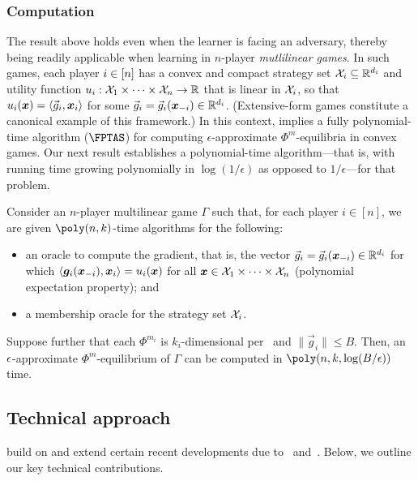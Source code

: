 \subsubsection{Computation}

The result above holds even when the learner is facing an adversary, thereby being readily applicable when learning in $n$-player \emph{mutlilinear games}. In such games, each player $i \in [n]$ has a convex and compact strategy set ${\mathcal{X}}_i \subseteq \mathbb R^{d_i}$ and utility function $u_i : {\mathcal{X}}_1 \times \dots \times {\mathcal{X}}_n \to \mathbb R$ that is linear in ${\mathcal{X}}_i$, so that $u_i({\bm{x}}) = \langle \vec{g}_i, {\bm{x}}_i \rangle$ for some $\vec{g}_i = \vec{g}_i({\bm{x}}_{-i}) \in \mathbb R^{d_i}$. (Extensive-form games constitute a canonical example of this framework.) In this context,  implies a fully polynomial-time algorithm ($\FPTAS$) for computing $\epsilon$-approximate $\Phi^m$-equilibria in convex games. Our next result establishes a polynomial-time algorithm---that is, with running time growing polynomially in $\log(1/\epsilon)$ as opposed to $1/\epsilon$---for that problem.

\begin{theorem}
    \label{theorem:main-eah}
    Consider an $n$-player multilinear game $\Gamma$ such that, for each player $i \in [n]$, we are given $\poly(n, k)$-time algorithms for the following:
\begin{itemize}
\item an oracle to compute the gradient, that is, the vector $\vec{g}_i = \vec{g}_i({\bm{x}}_{-i}) \in \mathbb R^{d_i}$ for which $\ip{\vg_i(\vx_{-i}), \vx_i} = u_i(\vx)$ for all ${\bm{x}} \in {\mathcal{X}}_1 \times \dots \times {\mathcal{X}}_n$ (polynomial expectation property); and
\item a membership oracle for the strategy set ${\mathcal{X}}_i$.
\end{itemize}
Suppose further that each $\Phi^{m_i}$ is $k_i$-dimensional per~ and $\|\vec{g}_i \| \leq B$. Then, an $\epsilon$-approximate $\Phi^m$-equilibrium of $\Gamma$ can be computed in $\poly\qty(n, k, \log(B/\eps))$ time.
\end{theorem}

\subsection{Technical approach}

 build on and extend certain recent developments due to~\citet{Daskalakis24:Efficient} and~\citet{Zhang24:Efficient}. Below, we outline our key technical contributions.


